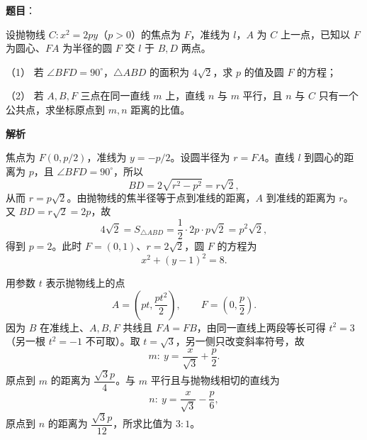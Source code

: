 \begin{answer}


\end{answer}
\begin{answer}

\textbf{题目}：

设抛物线 $C:x^2=2py$（$p>0$）的焦点为 $F$，准线为 $l$，$A$ 为 $C$ 上一点，已知以 $F$ 为圆心、$FA$ 为半径的圆 $F$ 交 $l$ 于 $B,D$ 两点。

（1） 若 $\angle BFD=90^\circ$，$\triangle ABD$ 的面积为 $4\sqrt2$，求 $p$ 的值及圆 $F$ 的方程；

（2） 若 $A,B,F$ 三点在同一直线 $m$ 上，直线 $n$ 与 $m$ 平行，且 $n$ 与 $C$ 只有一个公共点，求坐标原点到 $m,n$ 距离的比值。

\textbf{解析}


焦点为 $F(0,p/2)$，准线为 $y=-p/2$。设圆半径为 $r=FA$。直线 $l$ 到圆心的距离为 $p$，且 $\angle BFD=90^\circ$，所以
\nopagebreak[4]
\[
BD=2\sqrt{r^2-p^2}=r\sqrt2,
\]
从而 $r=p\sqrt2$。由抛物线的焦半径等于点到准线的距离，$A$ 到准线的距离为 $r$。又 $BD=r\sqrt2=2p$，故
\nopagebreak[4]
\[
4\sqrt2=S_{\triangle ABD}
=\frac12\cdot2p\cdot p\sqrt2=p^2\sqrt2,
\]
得到 $p=2$。此时 $F=(0,1)$、$r=2\sqrt2$，圆 $F$ 的方程为
\nopagebreak[4]
\[
x^2+(y-1)^2=8.
\]


用参数 $t$ 表示抛物线上的点
\nopagebreak[4]
\[
A=\left(pt,\frac{pt^2}{2}\right),\qquad
F=\left(0,\frac p2\right).
\]
因为 $B$ 在准线上、$A,B,F$ 共线且 $FA=FB$，由同一直线上两段等长可得 $t^2=3$（另一根 $t^2=-1$ 不可取）。取 $t=\sqrt3$，另一侧只改变斜率符号，故
\nopagebreak[4]
\[
m:\ y=\frac{x}{\sqrt3}+\frac p2.
\]
原点到 $m$ 的距离为 $\dfrac{\sqrt3p}{4}$。与 $m$ 平行且与抛物线相切的直线为
\nopagebreak[4]
\[
n:\ y=\frac{x}{\sqrt3}-\frac p6,
\]
原点到 $n$ 的距离为 $\dfrac{\sqrt3p}{12}$，所求比值为 $3:1$。



\end{answer}
